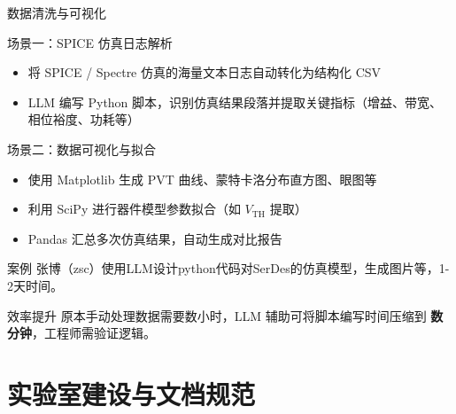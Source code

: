 \documentclass[aspectratio=169, 10pt, UTF8]{ctexbeamer}
\begin{document}
\begin{frame}{数据清洗与可视化}
  \begin{block}{场景一：SPICE 仿真日志解析}
    \begin{itemize}
      \item 将 SPICE / Spectre 仿真的海量文本日志自动转化为结构化 CSV
      \item LLM 编写 Python 脚本，识别仿真结果段落并提取关键指标（增益、带宽、相位裕度、功耗等）
    \end{itemize}
  \end{block}

  \begin{block}{场景二：数据可视化与拟合}
    \begin{itemize}
      \item 使用 Matplotlib 生成 PVT 曲线、蒙特卡洛分布直方图、眼图等
      \item 利用 SciPy 进行器件模型参数拟合（如 $V_{\text{TH}}$ 提取）
      \item Pandas 汇总多次仿真结果，自动生成对比报告
    \end{itemize}
  \end{block}
  \begin{alertblock}{案例}
    张博（zsc）使用LLM设计python代码对SerDes的仿真模型，生成图片等，1-2天时间。
  \end{alertblock}
  \begin{exampleblock}{效率提升}
    原本手动处理数据需要数小时，LLM 辅助可将脚本编写时间压缩到 \textbf{数分钟}，工程师需验证逻辑。
  \end{exampleblock}

\end{frame}

\section{实验室建设与文档规范}
\end{document}
